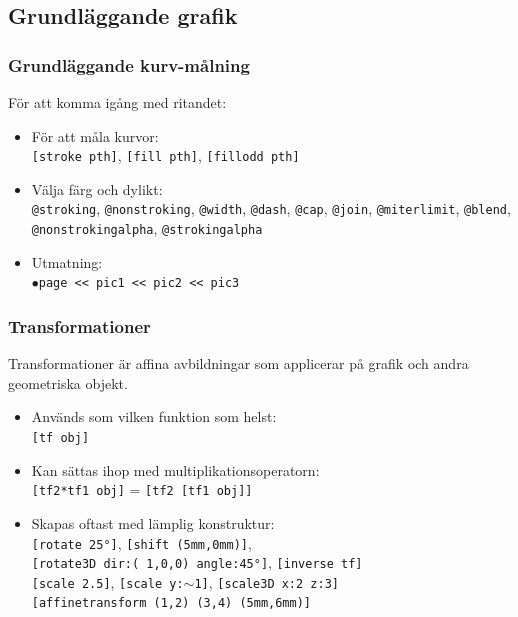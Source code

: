 \documentclass[noamsthm,handout]{beamer}
\begin{document}
\subsection{Grundläggande grafik}
\begin{frame}\frametitle{Grundläggande kurv-målning}
  För att komma igång med ritandet:
  \begin{itemize}
  \item För att måla kurvor:\\
    \texttt{[{\color{red}stroke} pth]}, \texttt{[{\color{red}fill} pth]}, \texttt{[{\color{red}fillodd} pth]}
  \item Välja färg och dylikt:\\
    \texttt{@stroking}, \texttt{@nonstroking}, \texttt{@width}, \texttt{@dash}, \texttt{@cap}, \texttt{@join}, \texttt{@miterlimit}, \texttt{@blend}, \texttt{@nonstrokingalpha}, \texttt{@strokingalpha}
  \item Utmatning:\\
    \texttt{$\bullet$page <{}< pic1 <{}< pic2 <{}< pic3}
  \end{itemize}
\end{frame}
\begin{frame}\frametitle{Transformationer}
  Transformationer är affina avbildningar som applicerar på grafik och andra geometriska objekt.
  \begin{itemize}
  \item Används som vilken funktion som helst:\\
    \texttt{[tf obj]}
  \item Kan sättas ihop med multiplikationsoperatorn:\\
    \texttt{[tf2*tf1 obj]} = \texttt{[tf2 [tf1 obj]]}
  \item Skapas oftast med lämplig konstruktur:\\
    \texttt{[rotate 25°]}, \texttt{[shift (5mm,0mm)]}, \\
    \texttt{[rotate3D dir:(~1,0,0) angle:45°]}, \texttt{[inverse tf]}\\
    \texttt{[scale 2.5]}, \texttt{[scale y:$\sim$1]}, \texttt{[scale3D x:2 z:3]}\\
    \texttt{[affinetransform (1,2) (3,4) (5mm,6mm)]}
  \end{itemize}
\end{frame}
\end{document}
